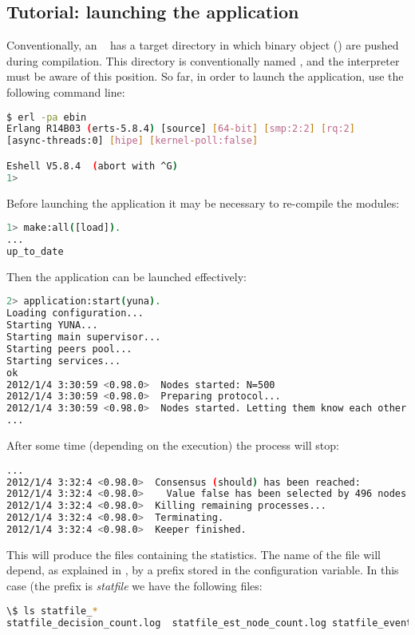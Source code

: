 \subsection{Tutorial: launching the application}

Conventionally, an \Erlang\  has a target directory
in which binary object () are pushed during compilation. This
directory is conventionally named , and the interpreter must be
aware of this position. So far, in order to launch the application, use
the following command line:
\begin{lstlisting}[language=bash]
$ erl -pa ebin
Erlang R14B03 (erts-5.8.4) [source] [64-bit] [smp:2:2] [rq:2]
[async-threads:0] [hipe] [kernel-poll:false]

Eshell V5.8.4  (abort with ^G)
1>
\end{lstlisting}

Before launching the application it may be necessary to re-compile the
modules:
\begin{lstlisting}[language=bash]
1> make:all([load]).
...
up_to_date
\end{lstlisting}

Then the application can be launched effectively:
\begin{lstlisting}[language=bash]
2> application:start(yuna).
Loading configuration...
Starting YUNA...
Starting main supervisor...
Starting peers pool...
Starting services...
ok
2012/1/4 3:30:59 <0.98.0>  Nodes started: N=500
2012/1/4 3:30:59 <0.98.0>  Preparing protocol...
2012/1/4 3:30:59 <0.98.0>  Nodes started. Letting them know each other...
...
\end{lstlisting}

After some time (depending on the execution) the process will stop:
\begin{lstlisting}[language=bash]
...
2012/1/4 3:32:4 <0.98.0>  Consensus (should) has been reached:
2012/1/4 3:32:4 <0.98.0>    Value false has been selected by 496 nodes
2012/1/4 3:32:4 <0.98.0>  Killing remaining processes...
2012/1/4 3:32:4 <0.98.0>  Terminating.
2012/1/4 3:32:4 <0.98.0>  Keeper finished.
\end{lstlisting}

This will produce the files containing the statistics. The name of the
file will depend, as explained in , by a
prefix stored in the configuration variable. In this case (the prefix is
\emph{statfile} we have the following files:
\begin{lstlisting}[language=bash]
\$ ls statfile_*
statfile_decision_count.log  statfile_est_node_count.log statfile_events.log  statfile_node_count.log
\end{lstlisting}


